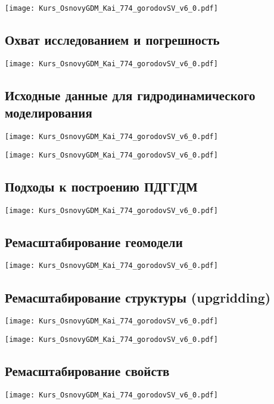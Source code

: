 \documentclass[main.tex]{subfiles}
\begin{document}
\texttt{[image: Kurs\_OsnovyGDM\_Kai\_774\_gorodovSV\_v6\_0.pdf]}

\subsection{Охват исследованием и погрешность}

\texttt{[image: Kurs\_OsnovyGDM\_Kai\_774\_gorodovSV\_v6\_0.pdf]}

\subsection{Исходные данные для гидродинамического моделирования}

\texttt{[image: Kurs\_OsnovyGDM\_Kai\_774\_gorodovSV\_v6\_0.pdf]}

\texttt{[image: Kurs\_OsnovyGDM\_Kai\_774\_gorodovSV\_v6\_0.pdf]}

\subsection{Подходы к построению ПДГГДМ}

\texttt{[image: Kurs\_OsnovyGDM\_Kai\_774\_gorodovSV\_v6\_0.pdf]}

\subsection{Ремасштабирование геомодели}

\texttt{[image: Kurs\_OsnovyGDM\_Kai\_774\_gorodovSV\_v6\_0.pdf]}

\subsection{Ремасштабирование структуры (upgridding)}

\texttt{[image: Kurs\_OsnovyGDM\_Kai\_774\_gorodovSV\_v6\_0.pdf]}

\texttt{[image: Kurs\_OsnovyGDM\_Kai\_774\_gorodovSV\_v6\_0.pdf]}

\subsection{Ремасштабирование свойств}

\texttt{[image: Kurs\_OsnovyGDM\_Kai\_774\_gorodovSV\_v6\_0.pdf]}
\end{document}
